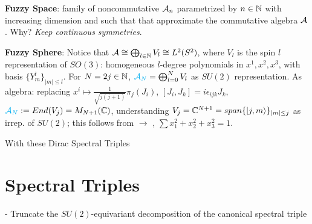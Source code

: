 \textbf{Fuzzy Space}: %
    family of noncommutative $\mathcal A_n$ parametrized by $n \in \mathbb{N}$ with increasing dimension and such that that approximate the commutative algebra $\mathcal A$. Why? \textit{Keep continuous symmetries}.
    
    \textbf{Fuzzy Sphere}: Notice that $\mathcal A \cong \bigoplus_{l \in \mathbb{N}} V_l \cong L^2(S^2)$, where $V_l$ is the spin $l$ representation of $SO(3)$: homogeneous $l$-degree polynomials in $x^1, x^2, x^3$, with basis $\{Y^l_m\}_{|m| \leq l}$. 
    For $N = 2j \in \mathbb{N}$, 
    $\textcolor{cyan}{\mathcal A_N}= \bigoplus_{l = 0}^N V_l$ as $SU(2)$ representation. 
    As algebra: replacing $x^i \mapsto \frac{1}{\sqrt{j(j+1)}} \pi_{j}(J_i)$, $[J_i, J_k] = i \epsilon_{ijk} J_k$, $\textcolor{cyan}{\mathcal A_N} := End(V_j) = M_{N+1}(\mathbb{C})$, understanding $V_j= \mathbb{C}^{N+1} = span\{|j, m\rangle\}_{|m| \leq j}$ as irrep. of $SU(2)$; this follows from  $\longrightarrow$ , $\sum x_1^2 + x_2^2 + x_3^2 = 1$.
    
    With these Dirac Spectral Triples \cite{DAndrea2013} 
    
    
    
\linea

\section{Spectral Triples}

 - Truncate the $SU(2)$-equivariant decomposition of the canonical spectral triple

